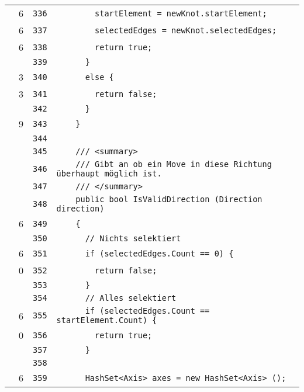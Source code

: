 \documentclass[a4paper,10pt]{article}
\begin{document}
\begin{longtable}[l]{lrrl}
\cellcolor{green} & 6 & \verb~336~ & \verb~        startElement = newKnot.startElement;~\\
\cellcolor{green} & 6 & \verb~337~ & \verb~        selectedEdges = newKnot.selectedEdges;~\\
\cellcolor{green} & 6 & \verb~338~ & \verb~        return true;~\\
\cellcolor{gray} &  & \verb~339~ & \verb~      }~\\
\cellcolor{green} & 3 & \verb~340~ & \verb~      else {~\\
\cellcolor{green} & 3 & \verb~341~ & \verb~        return false;~\\
\cellcolor{gray} &  & \verb~342~ & \verb~      }~\\
\cellcolor{green} & 9 & \verb~343~ & \verb~    }~\\
\cellcolor{gray} &  & \verb~344~ & \verb~~\\
\cellcolor{gray} &  & \verb~345~ & \verb~    /// <summary>~\\
\cellcolor{gray} &  & \verb~346~ & \verb~    /// Gibt an ob ein Move in diese Richtung überhaupt möglich ist.~\\
\cellcolor{gray} &  & \verb~347~ & \verb~    /// </summary>~\\
\cellcolor{gray} &  & \verb~348~ & \verb~    public bool IsValidDirection (Direction direction)~\\
\cellcolor{green} & 6 & \verb~349~ & \verb~    {~\\
\cellcolor{gray} &  & \verb~350~ & \verb~      // Nichts selektiert~\\
\cellcolor{green} & 6 & \verb~351~ & \verb~      if (selectedEdges.Count == 0) {~\\
\cellcolor{red} & 0 & \verb~352~ & \verb~        return false;~\\
\cellcolor{gray} &  & \verb~353~ & \verb~      }~\\
\cellcolor{gray} &  & \verb~354~ & \verb~      // Alles selektiert~\\
\cellcolor{green} & 6 & \verb~355~ & \verb~      if (selectedEdges.Count == startElement.Count) {~\\
\cellcolor{red} & 0 & \verb~356~ & \verb~        return true;~\\
\cellcolor{gray} &  & \verb~357~ & \verb~      }~\\
\cellcolor{gray} &  & \verb~358~ & \verb~~\\
\cellcolor{green} & 6 & \verb~359~ & \verb~      HashSet<Axis> axes = new HashSet<Axis> ();~\\

\end{longtable}
\end{document}
